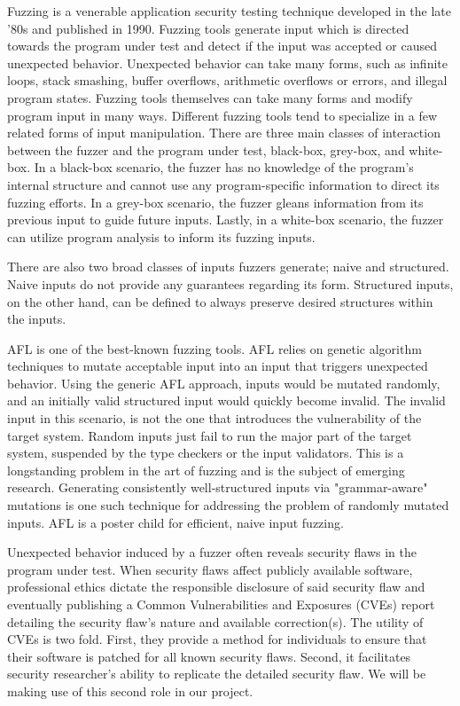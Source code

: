 \documentclass[12pt]{diazessay}
\begin{document}
Fuzzing is a venerable application security testing technique developed in the late '80s\cite{Barton1988} and published in 1990\cite{Miller1990}.
Fuzzing tools generate input which is directed towards the program under test and detect if the input was accepted or caused unexpected behavior.
Unexpected behavior can take many forms, such as infinite loops, stack smashing, buffer overflows, arithmetic overflows or errors, and illegal program states.
Fuzzing tools themselves can take many forms\cite{ModelBasedFuzzing}\cite{GrammarBasedFuzzing}\cite{ProtocolBasedFuzzing} and modify program input in many ways.
Different fuzzing tools tend to specialize in a few related forms of input\cite{InputDiversity} manipulation.
There are three main classes of interaction between the fuzzer and the program under test, black-box\cite{takanen2018fuzzing}, grey-box, and white-box\cite{fuzzingsurvey}.
In a black-box scenario, the fuzzer has no knowledge of the program's internal structure and cannot use any program-specific information to direct its fuzzing efforts.
In a grey-box scenario, the fuzzer gleans information from its previous input to guide future inputs.
Lastly, in a white-box scenario, the fuzzer can utilize program analysis to inform its fuzzing inputs.

There are also two broad classes of inputs fuzzers generate; naive and structured\cite{fuzzingsurvey}.
Naive inputs do not provide any guarantees regarding its form.
Structured inputs, on the other hand, can be defined to always preserve desired structures within the inputs.

AFL\cite{AFL_page} is one of the best-known fuzzing tools. AFL relies on genetic algorithm techniques\cite{InputMutationAlgorithm} to mutate acceptable input into an input that triggers unexpected behavior.
Using the generic AFL approach, inputs would be mutated randomly, and an initially valid structured input would quickly become invalid.
The invalid input in this scenario, is not the one that introduces the vulnerability of the target system.
Random inputs just fail to run the major part of the target system, suspended by the type checkers or the input validators.
This is a longstanding problem in the art of fuzzing and is the subject of emerging research.
Generating consistently well-structured inputs\cite{structuredInput} via "grammar-aware" mutations is one such technique for addressing the problem of randomly mutated inputs.
AFL is a poster child for efficient, naive input fuzzing.

Unexpected behavior induced by a fuzzer often reveals security flaws in the program under test.
When security flaws affect publicly available software, professional ethics dictate the responsible disclosure of said security flaw and eventually publishing a Common Vulnerabilities and Exposures (CVEs) \cite{mell2002use} report detailing the security flaw's nature and available correction(s).
The utility of CVEs is two fold.
First, they provide a method for individuals to ensure that their software is patched for all known security flaws.
Second, it facilitates security researcher's ability to replicate the detailed security flaw.
We will be making use of this second role in our project.
\end{document}
